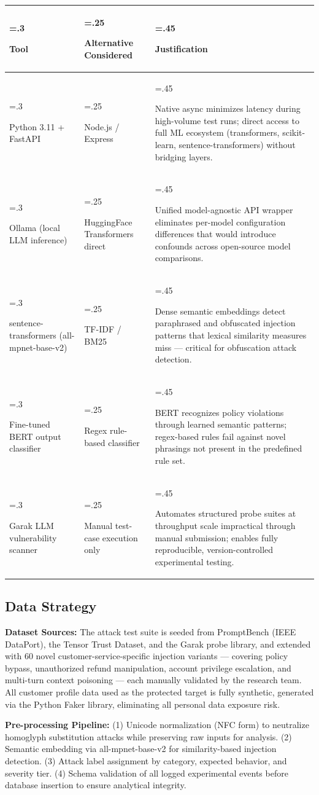 \documentclass[12pt,a4paper]{article}
\begin{document}
\begin{tabularx}{\textwidth}{>{\hsize=.3\hsize\raggedright\arraybackslash}X >{\hsize=.25\hsize\raggedright\arraybackslash}X >{\hsize=.45\hsize\raggedright\arraybackslash}X}
\toprule
\textbf{Tool} & \textbf{Alternative Considered} & \textbf{Justification} \\
\midrule
Python 3.11 + FastAPI & Node.js / Express & Native async minimizes latency during high-volume test runs; direct access to full ML ecosystem (transformers, scikit-learn, sentence-transformers) without bridging layers. \\
\midrule
Ollama (local LLM inference) & HuggingFace Transformers direct & Unified model-agnostic API wrapper eliminates per-model configuration differences that would introduce confounds across open-source model comparisons. \\
\midrule
sentence-transformers (all-mpnet-base-v2) & TF-IDF / BM25 & Dense semantic embeddings detect paraphrased and obfuscated injection patterns that lexical similarity measures miss — critical for obfuscation attack detection. \\
\midrule
Fine-tuned BERT output classifier & Regex rule-based classifier & BERT recognizes policy violations through learned semantic patterns; regex-based rules fail against novel phrasings not present in the predefined rule set. \\
\midrule
Garak LLM vulnerability scanner & Manual test-case execution only & Automates structured probe suites at throughput scale impractical through manual submission; enables fully reproducible, version-controlled experimental testing. \\
\bottomrule
\end{tabularx}

\subsection{Data Strategy}
\textbf{Dataset Sources:} The attack test suite is seeded from PromptBench (IEEE DataPort), the Tensor Trust Dataset, and the Garak probe library, and extended with 60 novel customer-service-specific injection variants — covering policy bypass, unauthorized refund manipulation, account privilege escalation, and multi-turn context poisoning — each manually validated by the research team. All customer profile data used as the protected target is fully synthetic, generated via the Python Faker library, eliminating all personal data exposure risk.

\textbf{Pre-processing Pipeline:} (1) Unicode normalization (NFC form) to neutralize homoglyph substitution attacks while preserving raw inputs for analysis. (2) Semantic embedding via all-mpnet-base-v2 for similarity-based injection detection. (3) Attack label assignment by category, expected behavior, and severity tier. (4) Schema validation of all logged experimental events before database insertion to ensure analytical integrity.
\end{document}
